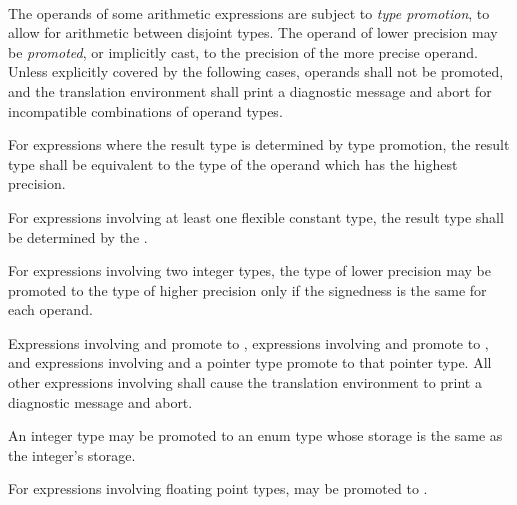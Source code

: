 
\begin{grammar}
 \\
	 \\
	 \\
	 \\
	 \\
	 \\
\end{grammar}


\specsubitem
The operands of some arithmetic expressions are subject to \textit{type
promotion}, to allow for arithmetic between disjoint types. The operand of
lower precision may be \textit{promoted}, or implicitly cast, to the precision
of the more precise operand. Unless explicitly covered by the following cases,
operands shall not be promoted, and the translation environment shall print a
diagnostic message and abort for incompatible combinations of operand types.

\specsubitem
For expressions where the result type is determined by type promotion, the
result type shall be equivalent to the type of the operand which has the
highest precision.

\specsubitem
For expressions involving at least one flexible constant type, the result type
shall be determined by the .

\specsubitem
For expressions involving two integer types, the type of lower precision may be
promoted to the type of higher precision only if the signedness is the same for
each operand.

\specsubitem
Expressions involving  and  promote to
, expressions involving  and 
promote to , and expressions involving  and
a pointer type promote to that pointer type. All other expressions involving
 shall cause the translation environment to print a diagnostic
message and abort.

\specsubitem
An integer type may be promoted to an enum type whose storage is the
same as the integer's storage.

\specsubitem
For expressions involving floating point types,  may be promoted
to .


